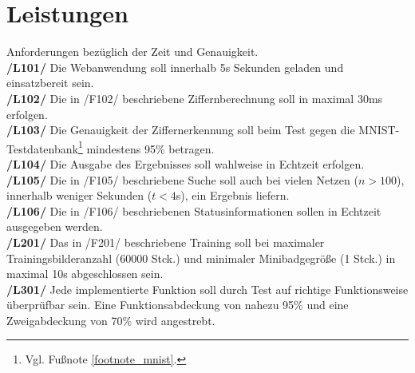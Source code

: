\section{Leistungen}
Anforderungen bezüglich der Zeit und Genauigkeit. \\[-0.2cm]

\textbf{/L101/} Die Webanwendung soll innerhalb 5s Sekunden geladen und einsatzbereit sein. \\[-0.2cm]

\textbf{/L102/} Die in /F102/ beschriebene Ziffernberechnung soll in maximal 30ms erfolgen.\\[-0.2cm]

\textbf{/L103/} Die Genauigkeit der Ziffernerkennung soll beim Test gegen die MNIST-Test\-datenbank\footnote{Vgl. Fußnote \ref{footnote_mnist}.} mindestens 95\% betragen.\\[-0.2cm]

\textbf{/L104/} Die Ausgabe des Ergebnisses soll wahlweise in Echtzeit erfolgen.\\[-0.2cm]

\textbf{/L105/} Die in /F105/ beschriebene Suche soll auch bei vielen Netzen ($n > 100$), innerhalb weniger Sekunden ($t<4$s), ein Ergebnis liefern.\\[-0.2cm]

\textbf{/L106/} Die in /F106/ beschriebenen Statusinformationen sollen in Echtzeit ausgegeben werden.\\[-0.2cm]

\textbf{/L201/} Das in /F201/ beschriebene Training soll bei maximaler Trainingsbilderanzahl (60000 Stck.) und minimaler Minibadgegröße (1 Stck.) in maximal 10s abgeschlossen sein.\\[-0.2cm]

\textbf{/L301/} Jede implementierte Funktion soll durch Test auf richtige Funktionsweise überprüfbar sein. Eine Funktionsabdeckung von nahezu 95\% und eine Zweigabdeckung von 70\% wird angestrebt.\\[-0.2cm]

